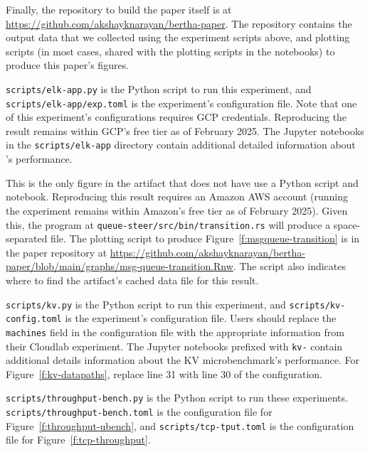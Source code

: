 \begin{appendix}
Finally, the repository to build the paper itself is at \url{https://github.com/akshayknarayan/bertha-paper}. The repository contains the output data that we collected using the experiment scripts above, and plotting scripts (in most cases, shared with the plotting scripts in the notebooks) to produce this paper's figures.

 \texttt{scripts/elk-app.py} is the Python script to run this experiment, and \texttt{scripts/elk-app/exp.toml} is the experiment's configuration file. Note that one of this experiment's configurations requires GCP credentials. Reproducing the result remains within GCP's free tier as of February 2025. The Jupyter notebooks in the \texttt{scripts/elk-app} directory contain additional detailed information about \etlapp's performance.

 This is the only figure in the artifact that does not have use a Python script and notebook. Reproducing this result requires an Amazon AWS account (running the experiment remains within Amazon's free tier as of February 2025). Given this, the program at \texttt{queue-steer/src/bin/transition.rs} will produce a space-separated file.
The plotting script to produce Figure~\ref{f:msgqueue-transition} is in the paper repository at \url{https://github.com/akshayknarayan/bertha-paper/blob/main/graphs/msg-queue-transition.Rnw}. The script also indicates where to find the artifact's cached data file for this result.

 \texttt{scripts/kv.py} is the Python script to run this experiment, and \texttt{scripts/kv-config.toml} is the experiment's configuration file. Users should replace the \texttt{machines} field in the configuration file with the appropriate information from their Cloudlab experiment. The Jupyter notebooks prefixed with \texttt{kv-} contain additional details information about the KV microbenchmark's performance. For Figure~\ref{f:kv-datapaths}, replace line 31 with line 30 of the configuration.

 \texttt{scripts/throughput-bench.py} is the Python script to run these experiments. \texttt{scripts/throughput-bench.toml} is the configuration file for Figure~\ref{f:throughput-ubench}, and \texttt{scripts/tcp-tput.toml} is the configuration file for Figure~\ref{f:tcp-throughput}.


\end{appendix}